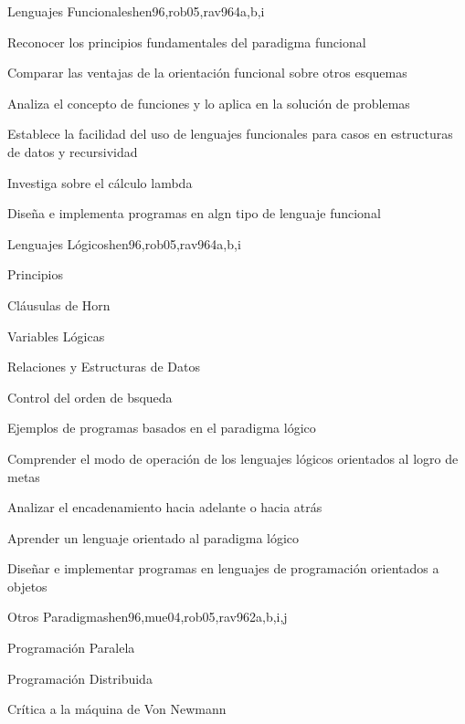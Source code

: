 \begin{syllabus}
\begin{unit}{Lenguajes Funcionales}{hen96,rob05,rav96}{4}{a,b,i}
   \begin{learningoutcomes}
      \item Reconocer los principios fundamentales del paradigma
      funcional
      \item Comparar las ventajas de la orientación funcional sobre
      otros esquemas
      \item Analiza el concepto de funciones y lo aplica en la
      solución de problemas
      \item Establece la facilidad del uso de lenguajes funcionales
      para casos en estructuras de datos y recursividad
      \item Investiga sobre el cálculo lambda
      \item Diseña e implementa programas en algn tipo de lenguaje
      funcional
   \end{learningoutcomes}
\end{unit}

\begin{unit}{Lenguajes Lógicos}{hen96,rob05,rav96}{4}{a,b,i}
\begin{topics}
      \item Principios
      \item Cláusulas de Horn
      \item Variables Lógicas
      \item Relaciones y Estructuras de Datos
      \item Control del orden de bsqueda
      \item Ejemplos de programas basados en el paradigma lógico

   \end{topics}

   \begin{learningoutcomes}
      \item Comprender el modo de operación de los lenguajes lógicos
      orientados al logro de metas
      \item Analizar el encadenamiento hacia adelante o hacia atrás
      \item Aprender un lenguaje orientado al paradigma lógico
      \item Diseñar e implementar programas en lenguajes de
      programación orientados a objetos
   \end{learningoutcomes}
\end{unit}

\begin{unit}{Otros Paradigmas}{hen96,mue04,rob05,rav96}{2}{a,b,i,j}
\begin{topics}
      \item Programación Paralela
      \item Programación Distribuida
      \item Crítica a la máquina de Von Newmann
   \end{topics}


\end{unit}
\end{syllabus}
